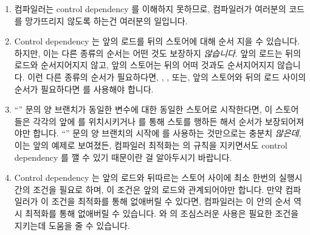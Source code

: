 \begin{enumerate}
\item	컴파일러는 control dependency 를 이해하지 못하므로, 컴파일러가 여러분의
	코드를 망가뜨리지 않도록 하는건 여러분의 일입니다.

\item	Control dependency 는 앞의 로드를 뒤의 스토어에 대해 순서 지을 수
	있습니다.
	하지만, 이는 다른 종류의 순서는 어떤 것도 보장하지 \emph{않습니다}.
	앞의 로드는 뒤의 로드와 순서지어지지 않고, 앞의 스토어는 뒤의 어떠
	것과도 순서지어지지 않습니다.
	이런 다른 종류의 순서가 필요하다면, , ,
	또는, 앞의 스토어와 뒤의 로드 사이의 순서가 필요하다면  를
	사용해야 합니다.

\item	``'' 문의 양 브랜치가 동일한 변수에 대한 동일한 스토어로
	시작한다면, 이 스토어들은 각각의 앞에  를 위치시키거나
	 를 통해 스토를 행하든 해서 순서가
	보장되어져야만 합니다.
	``'' 문의 양 브랜치의 시작에  를 사용하는
	것만으로는 충분치 \emph{않은데}, 이는 앞의 예제로 보여졌든, 컴파일러
	최적화는  의 규칙을 지키면서도 control dependency 를 깰
	수 있기 때문이란 걸 알아두시기 바랍니다.

\item	Control dependency 는 앞의 로드와 뒤따르는 스토어 사이에 최소 한번의
	실행시간의 조건을 필요로 하며, 이 조건은 앞의 로드와 관계되어야만
	합니다.
	만약 컴파일러가 이 조건을 최적화를 통해 없애버릴 수 있다면, 컴파일러는
	이 안의 순서 역시 최적화를 통해 없애버릴 수 있습니다.
	 와  의 조심스러운 사용은 필요한
	조건을 지키는데 도움을 줄 수 있습니다.


\end{enumerate}
